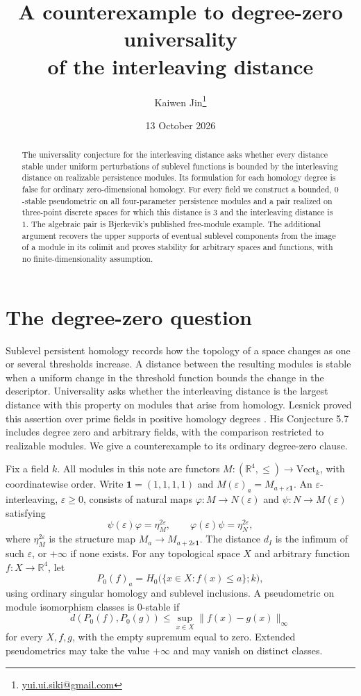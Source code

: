 \documentclass[11pt]{article}
\title{A counterexample to degree-zero universality\texorpdfstring{\\}{ }of the interleaving distance}
\author{Kaiwen Jin\thanks{\href{mailto:yui.ui.siki@gmail.com}{yui.ui.siki@gmail.com}}}
\date{13 October 2026}
\newcommand{\R}{\mathbb R}
\newcommand{\one}{\mathbf 1}
\newcommand{\Vect}{\mathrm{Vect}}
\begin{document}
\maketitle

\begin{abstract}
The universality conjecture for the interleaving distance asks whether every
distance stable under uniform perturbations of sublevel functions is bounded
by the interleaving distance on realizable persistence modules. Its formulation
for each homology degree is false for ordinary zero-dimensional homology.
For every field we construct a bounded, $0$-stable pseudometric on all
four-parameter persistence modules and a pair realized on three-point discrete
spaces for which this distance is $3$ and the interleaving distance is $1$.
The algebraic pair is Bjerkevik's published free-module example. The additional
argument recovers the upper supports of eventual sublevel components from the
image of a module in its colimit and proves stability for arbitrary spaces and
functions, with no finite-dimensionality assumption.
\end{abstract}

\section{The degree-zero question}

Sublevel persistent homology records how the topology of a space changes as
one or several thresholds increase. A distance between the resulting modules
is stable when a uniform change in the threshold function bounds the change
in the descriptor. Universality asks whether the interleaving distance is the
largest distance with this property on modules that arise from homology.
Lesnick proved this assertion over prime fields in positive homology degrees
\cite[Theorem 5.5]{Lesnick}. His Conjecture 5.7 includes degree zero and
arbitrary fields, with the comparison restricted to realizable modules.
We give a counterexample to its ordinary degree-zero clause.

Fix a field $k$. All modules in this note are functors
$M:(\R^4,\leq)\to\Vect_k$, with coordinatewise order. Write
$\one=(1,1,1,1)$ and $M(\varepsilon)_a=M_{a+\varepsilon\one}$.
An $\varepsilon$-interleaving, $\varepsilon\geq0$, consists of natural maps
$\varphi:M\to N(\varepsilon)$ and $\psi:N\to M(\varepsilon)$ satisfying
\[
 \psi(\varepsilon)\varphi=\eta_M^{2\varepsilon},\qquad
 \varphi(\varepsilon)\psi=\eta_N^{2\varepsilon},
\]
where $\eta_M^{2\varepsilon}$ is the structure map
$M_a\to M_{a+2\varepsilon\one}$. The distance $d_I$ is the infimum of
such $\varepsilon$, or $+\infty$ if none exists.
For any topological space $X$ and arbitrary function $f:X\to\R^4$, let
\[
 P_0(f)_a=H_0\bigl(\{x\in X:f(x)\leq a\};k\bigr),
\]
using ordinary singular homology and sublevel inclusions. A pseudometric on
module isomorphism classes is $0$-stable if
\begin{equation}\label{eq:stability}
 d(P_0(f),P_0(g))\leq
 \sup_{x\in X}\|f(x)-g(x)\|_\infty
\end{equation}
for every $X,f,g$, with the empty supremum equal to zero. Extended
pseudometrics may take the value $+\infty$ and may vanish on distinct classes.
\end{document}
